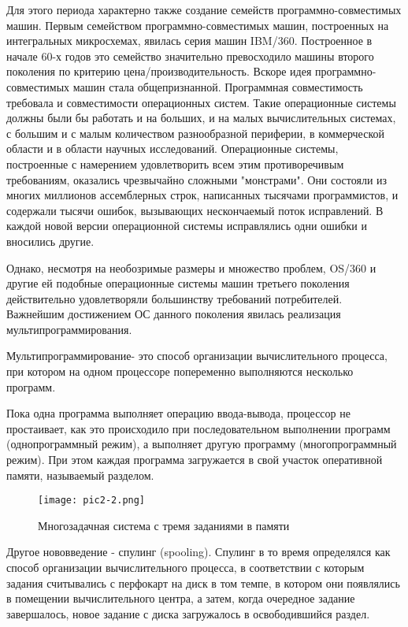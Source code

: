 Для этого периода характерно также создание семейств программно-совместимых машин. Первым семейством программно-совместимых машин, построенных на интегральных микросхемах, явилась серия машин IBM/360. Построенное в начале 60-х годов это семейство значительно превосходило машины второго поколения по критерию цена/производительность. Вскоре идея программно-совместимых машин стала общепризнанной.
Программная совместимость требовала и совместимости операционных систем. Такие операционные системы должны были бы работать и на больших, и на малых вычислительных системах, с большим и с малым количеством разнообразной периферии, в коммерческой области и в области научных исследований. Операционные системы, построенные с намерением удовлетворить всем этим противоречивым требованиям, оказались чрезвычайно сложными "монстрами". Они состояли из многих миллионов ассемблерных строк, написанных тысячами программистов, и содержали тысячи ошибок, вызывающих нескончаемый поток исправлений. В каждой новой версии операционной системы исправлялись одни ошибки и вносились другие.

Однако, несмотря на необозримые размеры и множество проблем, OS/360 и другие ей подобные операционные системы машин третьего поколения действительно удовлетворяли большинству требований потребителей. Важнейшим достижением ОС данного поколения явилась реализация мультипрограммирования.
\begin{opr}
   Мультипрограммирование- это способ организации вычислительного процесса, при котором на одном процессоре попеременно выполняются несколько программ.
\end{opr} Пока одна программа выполняет операцию ввода-вывода, процессор не простаивает, как это происходило при последовательном выполнении программ (однопрограммный режим), а выполняет другую программу (многопрограммный режим). При этом каждая программа загружается в свой участок оперативной памяти, называемый разделом.

\begin{figure}\center
   \texttt{[image: pic2-2.png]}
   \caption{Многозадачная система с тремя заданиями в памяти}
\end{figure}

Другое нововведение - спулинг (spooling). Спулинг в то время определялся как способ организации вычислительного процесса, в соответствии с которым задания считывались с перфокарт на диск в том темпе, в котором они появлялись в помещении вычислительного центра, а затем, когда очередное задание завершалось, новое задание с диска загружалось в освободившийся раздел.

